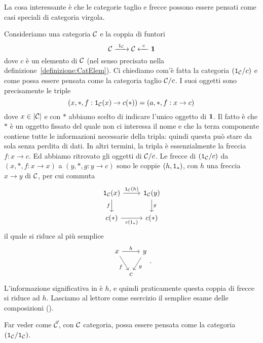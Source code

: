 La cosa interessante è che le categorie taglio e frecce possono essere pensati come casi speciali di categoria virgola.

\begin{esempio}
Consideriamo una categoria \(\mathcal C\) e la coppia di funtori
\[\mathcal C \xrightarrow{\ \mathtt{1}_\mathcal C\ } \mathcal C \xleftarrow{\ c\ } \mathbf{1}\]
dove \(c\) è un elemento di \(\mathcal C\) (nel senso precisato nella definizione~\ref{definizione:CatElem}). Ci chiediamo com'è fatta la categoria \((\mathtt{1}_\mathcal C/c)\) e come possa essere pensata come la categoria taglio \(\mathcal C/c\).\newline
I suoi oggetti sono precisamente le triple
\[(x, \ast, f : \mathtt{1}_\mathcal C(x) \to c(\ast)) = (a, \ast, f : x \to c)\,\]
dove \(x \in \lvert\mathcal C\rvert\) e con \(\ast\) abbiamo scelto di indicare l'unico oggetto di \(\mathbf{1}\). Il fatto è che \(\ast\) è un oggetto fissato del quale non ci interessa il nome e che la terza componente contiene tutte le informazioni necessarie della tripla: quindi questa può stare da sola senza perdita di dati. In altri termini, la tripla è essenzialmente la freccia \(f : x \to c\). Ed abbiamo ritrovato gli oggetti di \(\mathcal C/c\).\newline
Le frecce di \((\mathtt{1}_\mathcal C/c)\) da \((x, \ast, f : x \to x)\) a \((y, \ast, g : y \to c)\) sono le coppie \((h, \mathtt{1}_\ast)\), con \(h\) una freccia \(x \to y\) di \(\mathcal C\), per cui commuta
\[\begin{tikzcd}
\id_\catC(x) \ar["{\id_\catC(h)}", r] \ar["f", d, swap] &
\id_\catC(y) \ar["g", d] \\
c(\ast) \ar["{c(\id_\ast)}", r, swap] & c(\ast)
\end{tikzcd}\]
il quale si riduce al più semplice
\[\begin{tikzcd}[column sep = tiny]
x \ar["h", rr] \ar["f", dr, swap] &   & y \ar["g", dl] \\
                                  & c &
\end{tikzcd}.\]
L'informazione significativa in  è \(h\), e quindi praticamente questa coppia di frecce si riduce ad \(h\).\newline
Lasciamo al lettore come esercizio il semplice esame delle composizioni (\perlettore{}).
\end{esempio}

\begin{esercizio}
Far veder come \(\vec{\mathcal C}\), con \(\mathcal C\) categoria, possa essere pensata come la categoria \((\mathtt{1}_\mathcal C/\mathtt{1}_\mathcal C)\).
\end{esercizio}

